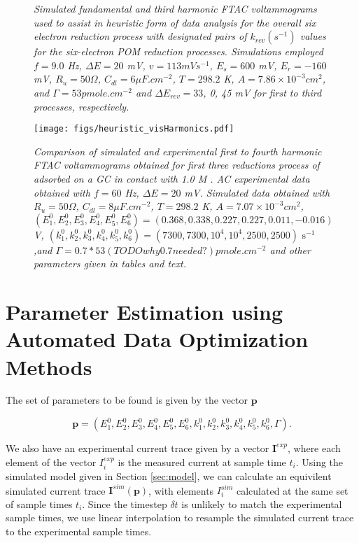 \documentclass[a4paper, 12pt]{article}
\begin{document}
\begin{figure}[htbp]
    \caption{\it{Simulated fundamental and third harmonic FTAC voltammograms 
    used to assist in heuristic form of data analysis for the overall six 
    electron reduction process with designated pairs of $k_{rev} (s^{-1})$ 
    values for the six-electron POM reduction processes. Simulations employed $f 
    = 9.0$ Hz, $\Delta E = 20$ mV, $v = 113 mV s^{-1}$, $E_{s} = 600$ mV, 
    $E_{r} = -160$ mV, $R_u = 50 \Omega$, $C_{dl} = 6 \mu F.cm^{-2}$, $T = 
    298.2$ K, $A = 7.86 \times 10^{-3} cm^2$, and $\Gamma = 53 pmole.cm^{-2}$ 
    and $\Delta E_{rev} = 33$, 0, 45 mV for first to third processes, 
    respectively.}}
    \label{fig:sim_for_heuristic_k}
\end{figure}

\begin{figure}[htbp]
\texttt{[image: figs/heuristic\_visHarmonics.pdf]}
    \caption{\it{Comparison of simulated and experimental first to fourth 
    harmonic FTAC voltammograms obtained for first three reductions process of 
     adsorbed on a GC in contact with 1.0 M . AC
    experimental data obtained with $f = 60$ Hz, $\Delta E = 20$ mV. Simulated
    data obtained with $R_u = 50 \Omega$, $C_{dl} = 8 \mu F.cm^{-2}$, $T =
    298.2$ K, $A = 7.07 \times 10^{-3} cm^2$,
    $(E^0_1,E^0_2,E^0_3,E^0_4,E^0_5,E^0_6) = (0.368, 0.338, 0.227, 0.227, 0.011,
    -0.016)$ V, $(k^0_1,k^0_2,k^0_3,k^0_4,k^0_5,k^0_6) = (7300, 7300, 10^4,
    10^4, 2500, 2500)\text{ s}^{-1}$,and $\Gamma = 0.7*53 (TODO why 0.7 needed?)
    pmole.cm^{-2}$ and other parameters given in tables and text.}}
    \label{fig:sim_and_exp}
\end{figure}


\section{Parameter Estimation using Automated Data Optimization Methods}\label{sec:automated}

The set of parameters to be found is given by the vector $\mathbf{p}$

$$
\mathbf{p} =
(E^0_1,E^0_2,E^0_3,E^0_4,E^0_5,E^0_6,k^0_1,k^0_2,k^0_3,k^0_4,k^0_5,k^0_6,\Gamma).
$$

We also have an experimental current trace given by a vector $\mathbf{I}^{exp}$,
where each element of the vector $I^{exp}_i$ is the measured current at sample
time $t_i$. Using the simulated model given in Section \ref{sec:model}, we
can calculate an equivilent simulated current trace
$\mathbf{I}^{sim}(\mathbf{p})$, with elements $I^{sim}_i$ calculated at the same
set of sample times $t_i$. Since the timestep $\delta t$ is unlikely to match
the experimental sample times, we use linear interpolation to resample the
simulated current trace to the experimental sample times.
\end{document}
